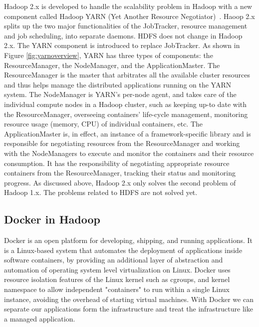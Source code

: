 Hadoop 2.x is developed to handle the scalability problem in Hadoop with a new component called Hadoop YARN (Yet Another Resource Negotiator)~\cite{vavilapalli2013apache}. Haoop 2.x splits up the two major functionalities of the JobTracker, resource management and job scheduling, into separate daemons. HDFS does not change in Hadoop 2.x. The YARN component is introduced to replace JobTracker. As shown in Figure \ref{fig:yarnoverview}, YARN has three types of components: the ResourceManager, the NodeManager, and the ApplicationMaster. The ResourceManager is the master that arbitrates all the available cluster resources and thus helps manage the distributed applications running on the YARN system. The NodeManager is YARN’s per-node agent, and takes care of the individual compute nodes in a Hadoop cluster, such as keeping up-to date with the ResourceManager, overseeing containers’ life-cycle management, monitoring resource usage (memory, CPU) of individual containers, etc. The ApplicationMaster is, in effect, an instance of a framework-specific library and is responsible for negotiating resources from the ResourceManager and working with the NodeManagers to execute and monitor the containers and their resource consumption. It has the responsibility of negotiating appropriate resource containers from the ResourceManager, tracking their status and monitoring progress. As discussed above, Hadoop 2.x only solves the second problem of Hadoop 1.x. The problems related to HDFS are not solved yet.

\subsection{Docker in Hadoop}
Docker is an open platform for developing, shipping, and running applications. It is a Linux-based system that automates the deployment of applications inside software containers, by providing an additional layer of abstraction and automation of operating system level virtualization on Linux. Docker uses resource isolation features of the Linux kernel such as cgroups, and kernel namespace to allow independent "containers" to run within a single Linux instance, avoiding the overhead of starting virtual machines. With Docker we can separate our applications form the infrastructure and treat the infrastructure like a managed application. 

